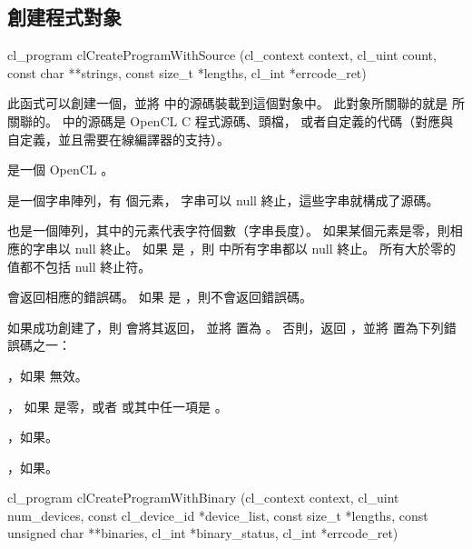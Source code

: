 \subsection{創建程式對象}


\startCLFUNC
cl_program clCreateProgramWithSource (cl_context context,
			cl_uint count,
			const char **strings,
			const size_t *lengths,
			cl_int *errcode_ret)
\stopCLFUNC

此函式可以創建一個，並將  中的源碼裝載到這個對象中。
此對象所關聯的就是  所關聯的。
 中的源碼是 OpenCL C 程式源碼、頭檔，
或者自定義的代碼（對應與自定義，並且需要在線編譯器的支持）。

 是一個 OpenCL 。

 是一個字串陣列，有  個元素，
字串可以 null 終止，這些字串就構成了源碼。

 也是一個陣列，其中的元素代表字符個數（字串長度）。
如果某個元素是零，則相應的字串以 null 終止。
如果  是 ，則  中所有字串都以 null 終止。
所有大於零的值都不包括 null 終止符。

 會返回相應的錯誤碼。
如果  是 ，則不會返回錯誤碼。

如果成功創建了，則  會將其返回，
並將  置為 。
否則，返回 ，並將  置為下列錯誤碼之一：
\startigBase
\item {}，如果  無效。

\item {}，
如果  是零，或者  或其中任一項是 。

\item {}，如果\scdevfailres。

\item {}，如果\schostfailres。
\stopigBase


\startCLFUNC
cl_program clCreateProgramWithBinary (cl_context context,
			cl_uint num_devices,
			const cl_device_id *device_list,
			const size_t *lengths,
			const unsigned char **binaries,
			cl_int *binary_status,
			cl_int *errcode_ret)
\stopCLFUNC

